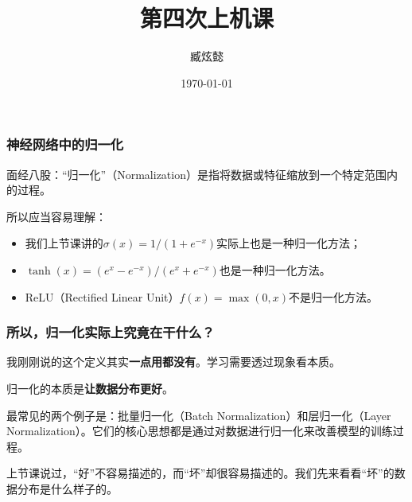 \documentclass{ctexbeamer}
\title{第四次上机课}
\author{臧炫懿}
\date{\today}
\begin{document}
\begin{frame}
\maketitle
\end{frame}

\begin{frame}
    \frametitle{神经网络中的归一化}

    面经八股：“归一化”（Normalization）是指将数据或特征缩放到一个特定范围内的过程。
    
    \vspace{1em}

    所以应当容易理解：
    \begin{itemize}
        \item 我们上节课讲的\(\sigma(x) = 1/(1 + e^{-x})\)实际上也是一种归一化方法；
        \item \(\tanh(x) = (e^x - e^{-x})/(e^x + e^{-x})\)也是一种归一化方法。
        \item ReLU（Rectified Linear Unit）\(f(x) = \max(0, x)\)不是归一化方法。
    \end{itemize}

\end{frame}

\begin{frame}
    \frametitle{所以，归一化实际上究竟在干什么？}

    我刚刚说的这个定义其实\textbf{一点用都没有}。学习需要透过现象看本质。
    
    归一化的本质是\textbf{让数据分布更好}。

    最常见的两个例子是：批量归一化（Batch Normalization）和层归一化（Layer Normalization）。它们的核心思想都是通过对数据进行归一化来改善模型的训练过程。

    \vspace{2em}

    上节课说过，“好”不容易描述的，而“坏”却很容易描述的。我们先来看看“坏”的数据分布是什么样子的。

\end{frame}
\end{document}
